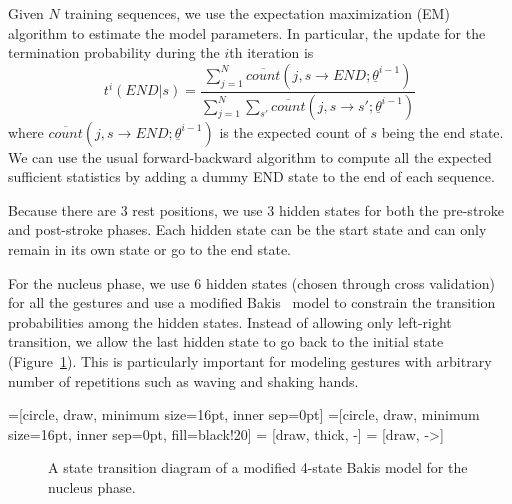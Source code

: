 \documentclass{sig-alternate-2013}
\begin{document}
Given $N$ training sequences, we use the expectation maximization (EM) algorithm to estimate the model parameters. In
particular, the update for the termination probability during the $i$th iteration is 
\begin{displaymath}
t^i(END|s) = \frac{\sum_{j = 1}^N \overline{count}(j, s\rightarrow END;\underline{\theta}^{i-1})}
    {\sum_{j = 1}^N\sum_{s'} \overline{count}(j, s\rightarrow s';\underline{\theta}^{i-1})}
\end{displaymath}
where $\overline{count}(j, s\rightarrow END;\underline{\theta}^{i-1})$ is the expected count of 
$s$ being the end state. We can use the usual forward-backward algorithm to compute all the 
expected sufficient statistics by adding a dummy END state to the end of each sequence.

Because there are 3 rest positions, we use 3 hidden states for both the pre-stroke and post-stroke phases.
Each hidden state can be the start state and can only remain in its own state or go to the end state.
 
For the nucleus phase, we use 6 hidden states (chosen through cross validation) for all the gestures and use a modified Bakis~\cite{bauer2000} model to constrain the transition probabilities
among the hidden states. Instead of allowing only left-right transition, we allow the last hidden state
to go back to the initial state (Figure~\ref{fig:bakis}). This is particularly important for modeling gestures with arbitrary number of
repetitions such as waving and shaking hands. 

=[circle, draw, minimum size=16pt, inner sep=0pt]
=[circle, draw, minimum size=16pt, inner
sep=0pt, fill=black!20] 
 = [draw, thick, -]
 = [draw, ->]

\begin{figure}[tb]
\centering
  \caption{A state transition diagram of a modified 4-state Bakis model for the nucleus phase.}
  \label{fig:bakis}
\end{figure}
\end{document}
